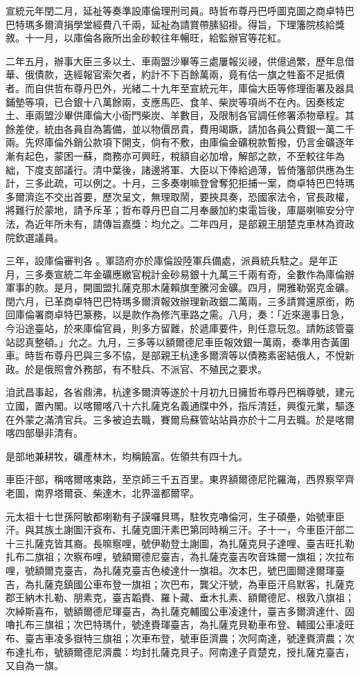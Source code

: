 \begin{pinyinscope}
宣統元年閏二月，延祉等奏準設庫倫理刑司員。時哲布尊丹巴呼圖克圖之商卓特巴巴特瑪多爾濟捐學堂經費八千兩，延祉為請賞帶膆貂褂。得旨，下理籓院核給獎敘。十一月，以庫倫各廠所出金砂較往年暢旺，給監辦官等花紅。

二年五月，辦事大臣三多以土、車兩盟沙畢等三處屢報災祲，供億過繁，歷年息借華、俄債款，迭經報官索欠者，約計不下百餘萬兩，竟有估一旗之牲畜不足抵債者。而自供哲布尊丹巴外，光緒二十九年至宣統元年，庫倫大臣等修理衙署及器具鋪墊等項，已合銀十八萬餘兩，支應馬匹、食羊、柴炭等項尚不在內。因奏核定土、車兩盟沙畢供庫倫大小衙門柴炭、羊數目，及限制各官調任修署添物章程。其餘差使，統由各員自為籌備，並以物價昂貴，費用竭蹶，請加各員公費銀一萬二千兩。先侭庫倫外銷公款項下開支，倘有不敷，由庫倫金礦稅款暫撥，仍言金礦逐年漸有起色，蒙困一蘇，商務亦可興旺，稅額自必加增，解部之款，不至較往年為絀，下度支部議行。清中葉後，諸邊將軍、大臣以下俸給過薄，皆倚籓部供應為生計，三多此疏，可以例之。十月，三多奏喇嘛登曾奪犯拒捕一案，商卓特巴巴特瑪多爾濟迄不交出首要，歷次呈文，無理取鬧，要挾具奏，恐國家法令，官長政權，將難行於蒙地，請予斥革；哲布尊丹巴自二月奉嚴加約束電旨後，庫屬喇嘛安分守法，為近年所未有，請傳旨嘉獎：均允之。二年四月，是部親王朋楚克車林為資政院欽選議員。

三年，設庫倫審判各。軍諮府亦於庫倫設陸軍兵備處，派員統兵駐之。是年正月，三多奏宣統二年金礦應繳官稅計金砂易銀十九萬三千兩有奇，全數作為庫倫辦軍事的款。是月，開圖盟扎薩克那木薩賴旗奎騰河金礦。四月，開雅勒弼克金礦。閏六月，已革商卓特巴巴特瑪多爾濟報效辦理新政銀二萬兩，三多請賞還原銜，飭回庫倫署商卓特巴篆務，以是款作為修汽車路之需。八月，奏：「近來邊事日急，今沿途臺站，於來庫倫官員，則多方留難，於遞庫要件，則任意玩忽。請飭該管臺站認真整頓。」允之。九月，三多等以額爾德尼車臣報效銀一萬兩，奏準用杏黃圍車。時哲布尊丹巴與三多不協，是部親王杭達多爾濟等以債務素密結俄人，不悅新政。於是俄照會外務部，有不駐兵、不派官、不殖民之要求。

洎武昌事起，各省鼎沸，杭達多爾濟等遂於十月初九日擁哲布尊丹巴稱尊號，建元立國，置內閣。以喀爾喀八十六扎薩克名義通牒中外，指斥清廷，興復元業，驅逐在外蒙之滿清官兵。三多被迫去職，賽爾烏蘇管站站員亦於十二月去職。於是喀爾喀四部舉非清有。

是部地兼耕牧，礦產林木，均稱饒富。佐領共有四十九。

車臣汗部，稱喀爾喀東路，至京師三千五百里。東界額爾德尼陀羅海，西界察罕齊老圖，南界塔爾袞、柴達木，北界溫都爾罕。

元太祖十七世孫阿敏都喇勒有子謨囉貝瑪，駐牧克嚕倫河，生子碩壘，始號車臣汗。與其族土謝圖汗袞布、扎薩克圖汗素巴第同時稱三汗。子十一，今車臣汗部二十三扎薩克皆其裔。長嘛察哩，號伊勒登土謝圖，為扎薩克貝子達哩、臺吉旺扎勒扎布二旗祖；次察布哩，號額爾德尼臺吉，為扎薩克臺吉吹音珠爾一旗祖；次拉布哩，號額爾克臺吉，為扎薩克臺吉色棱達什一旗祖。次本巴，號巴圖爾達爾琿臺吉，為扎薩克鎮國公車布登一旗祖；次巴布，龔父汗號，為車臣汗烏默客，扎薩克郡王納木扎勒、朋素克，臺吉韜賚、羅卜藏、垂木扎素、額爾德尼、根敦八旗祖；次綽斯喜布，號額爾德尼琿臺吉，為扎薩克輔國公車凌達什，臺吉多爾濟達什、固嚕扎布三旗祖；次巴特瑪什，號達賚琿臺吉，為扎薩克貝勒車布登、輔國公車凌旺布、臺吉車凌多嶽特三旗祖；次車布登，號車臣濟農；次阿南達，號達賚濟農；次布達扎布，號額爾德尼濟農：均封扎薩克貝子。阿南達子貢楚克，授扎薩克臺吉，又自為一旗。


\end{pinyinscope}

